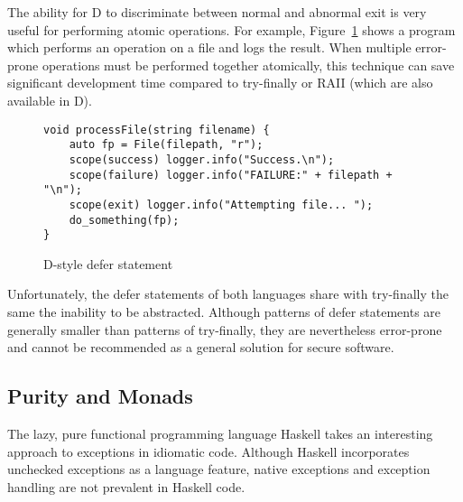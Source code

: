 \documentclass[11pt]{article}
\newcommand{\maybePage}{\newpage}
\begin{document}
The ability for D to discriminate between normal and abnormal exit is very useful for performing atomic operations.
For example, Figure~\ref{Dscope} shows a program which performs an operation on a file and logs the result.
When multiple error-prone operations must be performed together atomically, this technique can save significant development time compared to try-finally or RAII\cite{DExceptionSafety} (which are also available in D).

\begin{figure}[H]
\caption{D-style defer statement}
\label{Dscope}

\begin{verbatim}
void processFile(string filename) {
    auto fp = File(filepath, "r");
    scope(success) logger.info("Success.\n");
    scope(failure) logger.info("FAILURE:" + filepath + "\n");
    scope(exit) logger.info("Attempting file... ");
    do_something(fp);
}
\end{verbatim}

\end{figure}

Unfortunately, the defer statements of both languages share with try-finally the same the inability to be abstracted.
Although patterns of defer statements are generally smaller than patterns of try-finally, they are nevertheless error-prone and cannot be recommended as a general solution for secure software.




\maybePage
\subsection{Purity and Monads}
\label{subsec:exceptionMonads}
The lazy, pure functional programming language Haskell takes an interesting approach to exceptions in idiomatic code.
Although Haskell incorporates unchecked exceptions as a language feature, native exceptions and exception handling are not prevalent in Haskell code.
\end{document}
